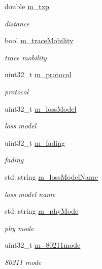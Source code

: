 \begin{DoxyCompactItemize}
double \hyperlink{classVanetRoutingExperiment_a8acdb7cf31487aa0d721263fde2a7f3e}{m\+\_\+txp}
\begin{DoxyCompactList}\small\item\em distance \end{DoxyCompactList}\item 
bool \hyperlink{classVanetRoutingExperiment_ad3900da2445a45ec098234888422075f}{m\+\_\+trace\+Mobility}
\begin{DoxyCompactList}\small\item\em trace mobility \end{DoxyCompactList}\item 
uint32\+\_\+t \hyperlink{classVanetRoutingExperiment_ab1a6336993a742c040c842f9ee25267f}{m\+\_\+protocol}
\begin{DoxyCompactList}\small\item\em protocol \end{DoxyCompactList}\item 
uint32\+\_\+t \hyperlink{classVanetRoutingExperiment_a6ca0dcdbcabbd60f246855590b4ee4f5}{m\+\_\+loss\+Model}
\begin{DoxyCompactList}\small\item\em loss model \end{DoxyCompactList}\item 
uint32\+\_\+t \hyperlink{classVanetRoutingExperiment_acdcef1359860a9bc93e678e15080544f}{m\+\_\+fading}
\begin{DoxyCompactList}\small\item\em fading \end{DoxyCompactList}\item 
std\+::string \hyperlink{classVanetRoutingExperiment_a973b4d1f55f7e425e1564db1cfd503f1}{m\+\_\+loss\+Model\+Name}
\begin{DoxyCompactList}\small\item\em loss model name \end{DoxyCompactList}\item 
std\+::string \hyperlink{classVanetRoutingExperiment_af9a40202146f6e8b06fb369d697a1fe9}{m\+\_\+phy\+Mode}
\begin{DoxyCompactList}\small\item\em phy mode \end{DoxyCompactList}\item 
uint32\+\_\+t \hyperlink{classVanetRoutingExperiment_aae21b34a7fb447a2d7d5bcbcbe8e5fae}{m\+\_\+80211mode}
\begin{DoxyCompactList}\small\item\em 80211 mode \end{DoxyCompactList}\item 

\end{DoxyCompactItemize}
